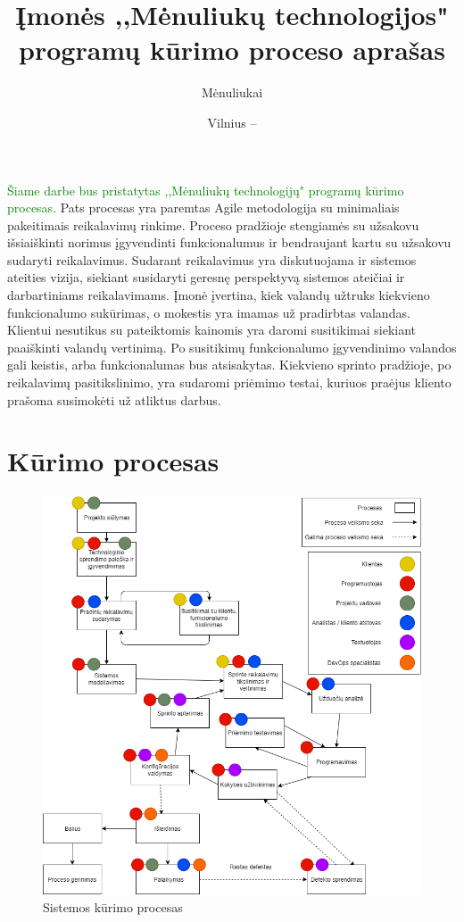 \documentclass{VUMIFPSkursinis}
\title{Įmonės ,,Mėnuliukų technologijos" programų kūrimo proceso aprašas}
\author{Mėnuliukai}
\date{Vilnius – \the\year}
\begin{document}
\maketitle

\tableofcontents

	\textcolor{green}{Šiame darbe bus pristatytas ,,Mėnuliukų technologijų" programų kūrimo procesas.}
	Pats procesas yra paremtas Agile metodologija su minimaliais pakeitimais reikalavimų rinkime.
	Proceso pradžioje stengiamės su užsakovu išsiaiškinti norimus įgyvendinti funkcionalumus ir bendraujant kartu su užsakovu sudaryti reikalavimus.
	Sudarant reikalavimus yra diskutuojama ir sistemos ateities vizija, siekiant susidaryti geresnę perspektyvą sistemos ateičiai ir darbartiniams reikalavimams.
	Įmonė įvertina, kiek valandų užtruks kiekvieno funkcionalumo sukūrimas, o mokestis yra imamas už pradirbtas valandas.
	Klientui nesutikus su pateiktomis kainomis yra daromi susitikimai siekiant paaiškinti valandų vertinimą. Po susitikimų funkcionalumo įgyvendinimo valandos gali keistis, arba funkcionalumas bus atsisakytas.
	Kiekvieno sprinto pradžioje, po reikalavimų pasitikslinimo, yra sudaromi priėmimo testai, kuriuos praėjus kliento prašoma susimokėti už atliktus darbus.

\section{Kūrimo procesas}
	\begin{figure}[htbp]
		\includegraphics[scale=0.6]{img/SoftwareProcessMoonTechnologies}
		\caption{Sistemos kūrimo procesas} %
		\label{img:kurimoProcesas}
	\end{figure}
\end{document}
